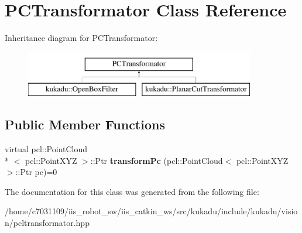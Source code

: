\hypertarget{classPCTransformator}{\section{P\-C\-Transformator Class Reference}
\label{classPCTransformator}
}
Inheritance diagram for P\-C\-Transformator\-:\begin{figure}[H]
\begin{center}
\leavevmode
\includegraphics[height=2.000000cm]{classPCTransformator}
\end{center}
\end{figure}
\subsection*{Public Member Functions}
\begin{DoxyCompactItemize}
\item 
\hypertarget{classPCTransformator_a2fcc61667d7d668b49bc75240f419838}{virtual pcl\-::\-Point\-Cloud\\*
$<$ pcl\-::\-Point\-X\-Y\-Z $>$\-::Ptr {\bfseries transform\-Pc} (pcl\-::\-Point\-Cloud$<$ pcl\-::\-Point\-X\-Y\-Z $>$\-::Ptr pc)=0}\label{classPCTransformator_a2fcc61667d7d668b49bc75240f419838}

\end{DoxyCompactItemize}


The documentation for this class was generated from the following file\-:\begin{DoxyCompactItemize}
\item 
/home/c7031109/iis\-\_\-robot\-\_\-sw/iis\-\_\-catkin\-\_\-ws/src/kukadu/include/kukadu/vision/pcltransformator.\-hpp\end{DoxyCompactItemize}
